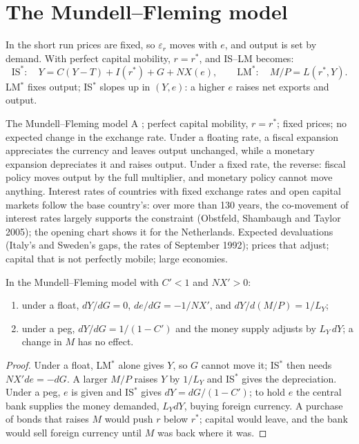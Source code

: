 \section{The Mundell--Fleming model}\label{sec:b1:open-economy:mf}

In the short run prices are fixed, so $\varepsilon_r$ moves with $e$, and output is set by
demand. With perfect capital mobility, $r = r^*$, and IS--LM becomes:
\[
\text{IS}^*: \quad Y = C(Y - T) + I(r^*) + G + NX(e), \qquad
\text{LM}^*: \quad M/P = L(r^*, Y).
\]
LM$^*$ fixes output; IS$^*$ slopes up in $(Y, e)$: a higher $e$ raises net exports and output.

\begin{model}{The Mundell--Fleming model}
\assumes A ; perfect capital mobility, $r = r^*$; fixed
prices; no expected change in the exchange rate.
\predicts Under a floating rate, a fiscal expansion appreciates the
currency and leaves output unchanged, while a monetary expansion
depreciates it and raises output. Under a fixed rate, the reverse: fiscal
policy moves output by the full multiplier, and monetary policy cannot
move anything.
\tested Interest rates of countries with fixed exchange rates and open
capital markets follow the base country's: over more than 130 years, the
co-movement of interest rates largely supports the constraint
(Obstfeld, Shambaugh and Taylor 2005); the opening chart shows it for
the Netherlands. %
\breaks Expected devaluations (Italy's and Sweden's gaps, the rates of
September 1992); prices that adjust; capital that is not perfectly
mobile; large economies.
\end{model}

\begin{proposition}\label{prop:b1:open-economy:regimes}
In the Mundell--Fleming model with $C' < 1$ and $NX' > 0$:
\begin{enumerate}
  \item under a float, $dY/dG = 0$, $de/dG = -1/NX'$, and $dY/d(M/P) = 1/L_Y$;
  \item under a peg, $dY/dG = 1/(1 - C')$ and the money supply adjusts by $L_Y\,dY$; a
    change in $M$ has no effect.
\end{enumerate}
\end{proposition}

\begin{proof}
Under a float, LM$^*$ alone gives $Y$, so $G$ cannot move it; IS$^*$ then needs
$NX'de = -dG$. A larger $M/P$ raises $Y$ by $1/L_Y$ and IS$^*$ gives the depreciation. Under a
peg, $e$ is given and IS$^*$ gives $dY = dG/(1 - C')$; to hold $e$ the central bank
supplies the money demanded, $L_Y dY$, buying foreign currency. A purchase of
bonds that raises $M$ would push $r$ below $r^*$; capital would leave, and the bank
would sell foreign currency until $M$ was back where it was.
\end{proof}

